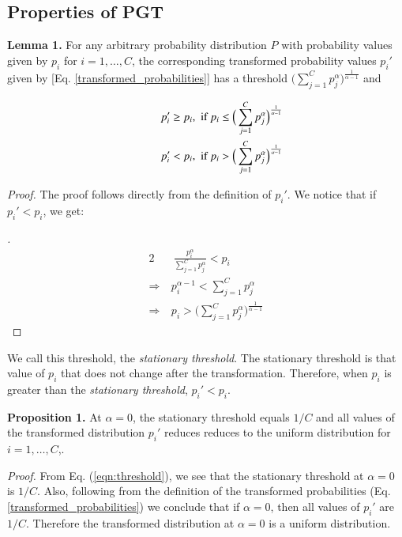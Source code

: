 \documentclass[times,sort&compress]{elsarticle}
\begin{document}
\subsection{Properties of PGT}
\label{sec:pgt_prop}

\textbf{Lemma 1.} For any arbitrary probability distribution $P$ with probability values
given by $p_i$ for $i=1,\dots,C$, the corresponding transformed probability values
$p_i'$ given by [Eq. \ref{transformed_probabilities}] has a threshold $\Big(\sum
_{j=1}^C p_j^{\alpha}\Big)^{\frac{1}{\alpha-1}}$ and

\begin{equation} \begin{split} p_i' \geq p_i & \text{,\ \ if } p_i \leq
\Big(\sum _{j=1}^C p_j^{\alpha }\Big)^{\frac{1}{\alpha-1}} \\ \hspace*{1cm}
p_i' < p_i & \text{,\ \ if } p_i > \Big(\sum _{j=1}^C
p_j^{\alpha}\Big)^{\frac{1}{\alpha-1}} \end{split} \label{eqn:threshold}
\end{equation}

\textit{Proof.} The proof follows directly from the definition of $p_i'$. We notice that
if $p_i' < p_i$, we get:

\begin{proof}[\unskip\nopunct] \begin{alignat}{2} &\ \ \frac{p_i^{\alpha }}{\sum
_{j=1}^C p_j^{\alpha}} < p_i \\ \Rightarrow &\ p_i^{\alpha -1}<\sum _{j=1}^C p_j^{\alpha
} \\ \Rightarrow &\ p_i > \Big(\sum _{j=1}^C p_j^{\alpha}\Big)^{\frac{1}{\alpha-1}}
\end{alignat} \end{proof}

We call this threshold, the \textit{stationary threshold}. The stationary threshold is
that value of $p_i$ that does not change after the transformation. Therefore, when $p_i$
is greater than the \textit{stationary threshold}, $p_i' < p_i$.



\textbf{Proposition 1.} At $\alpha=0$, the stationary threshold equals $1/C$ and all
values of the transformed distribution $p_i'$ reduces reduces to the uniform
distribution for $i=1,\dots,C$,.

\textit{Proof.} From Eq. (\ref{eqn:threshold}), we see that the stationary threshold at
$\alpha=0$ is $1/C$. Also, following from the definition of the transformed
probabilities (Eq. \ref{transformed_probabilities}) we conclude that if $\alpha=0$, then
all values of $p_i'$ are $1/C$. Therefore the transformed distribution at $\alpha=0$ is
a uniform distribution.
\end{document}
